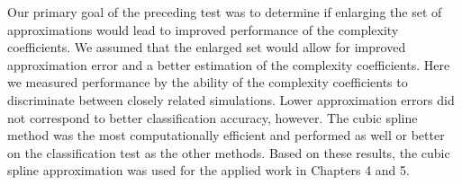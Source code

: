 Our primary goal of the preceding test was to determine 
if enlarging the set of approximations would lead to improved 
performance of the complexity coefficients. We assumed 
that the enlarged set would allow for improved approximation error 
and a better estimation of the complexity coefficients. 
Here we measured 
performance by the ability of the complexity coefficients to 
discriminate between closely related simulations. Lower 
approximation errors did not correspond to better classification
accuracy, however. The cubic spline method was the most computationally efficient and performed as well or better on the classification test as the other methods. Based on these results,
the cubic spline approximation was used for the applied work in 
Chapters 4 and 5.






